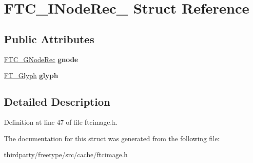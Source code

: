 \hypertarget{struct_f_t_c___i_node_rec__}{}\section{F\+T\+C\+\_\+\+I\+Node\+Rec\+\_\+ Struct Reference}
\label{struct_f_t_c___i_node_rec__}
\subsection*{Public Attributes}
\begin{DoxyCompactItemize}
\item 
\mbox{\label{struct_f_t_c___i_node_rec___a6a50cefe89c96afee41d23b075b7041d}} 
\hyperlink{struct_f_t_c___g_node_rec__}{F\+T\+C\+\_\+\+G\+Node\+Rec} {\bfseries gnode}
\item 
\mbox{\label{struct_f_t_c___i_node_rec___a7a007ab7794957b84d44dcc4af8f8713}} 
\hyperlink{struct_f_t___glyph_rec__}{F\+T\+\_\+\+Glyph} {\bfseries glyph}
\end{DoxyCompactItemize}


\subsection{Detailed Description}


Definition at line 47 of file ftcimage.\+h.



The documentation for this struct was generated from the following file\+:\begin{DoxyCompactItemize}
\item 
thirdparty/freetype/src/cache/ftcimage.\+h\end{DoxyCompactItemize}
